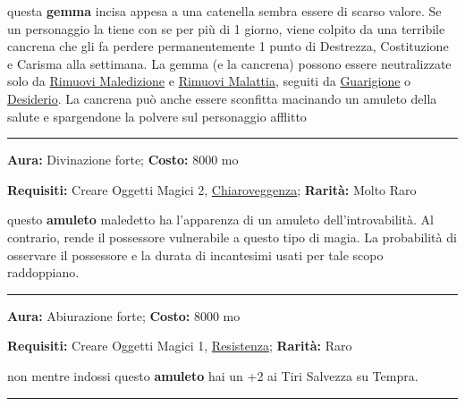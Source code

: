 \begin{multicols}{2}
questa \textbf{gemma} incisa appesa a una catenella sembra essere di scarso valore. Se un personaggio la tiene con se per più di 1 giorno, viene colpito da una terribile cancrena che gli fa perdere permanentemente 1 punto di Destrezza, Costituzione e Carisma alla settimana. La gemma (e la cancrena) possono essere neutralizzate solo da \hyperlink{Rimuovi Maledizione}{Rimuovi Maledizione} e \hyperlink{Rimuovi Malattia}{Rimuovi Malattia}, seguiti da \hyperlink{BastonedellaGuarigione}{Guarigione} o \hyperlink{Desiderio}{Desiderio}. La cancrena può anche essere sconfitta macinando un amuleto della salute e spargendone la polvere sul personaggio afflitto

\smallskip\noindent\rule{\linewidth}{2pt}  \hypertarget{AmuletodellaLocalizzazioneinevitabile}{}\medskip{}\noindent\label{AmuletodellaLocalizzazioneinevitabile}

\textbf{Aura:} Divinazione forte; \textbf{Costo:} 8000 mo

\textbf{Requisiti:} Creare Oggetti Magici 2, \hyperlink{PozionedellaChiaroveggenzaanimale}{Chiaroveggenza}; \textbf{Rarità:} Molto Raro


questo \textbf{amuleto} maledetto ha l'apparenza di un amuleto dell'introvabilità. Al contrario, rende il possessore vulnerabile a questo tipo di magia. La probabilità di osservare il possessore e la durata di incantesimi usati per tale scopo raddoppiano.

\smallskip\noindent\rule{\linewidth}{2pt}  \hypertarget{AmuletodellaResistenzaFisica}{}\medskip{}\noindent\label{AmuletodellaResistenzaFisica}

\textbf{Aura:} Abiurazione forte; \textbf{Costo:} 8000 mo

\textbf{Requisiti:} Creare Oggetti Magici 1, \hyperlink{ResistenzaalVeleno}{Resistenza}; \textbf{Rarità:} Raro

non mentre indossi questo \textbf{amuleto} hai un +2 ai Tiri Salvezza su Tempra.

\smallskip\noindent\rule{\linewidth}{2pt}  \hypertarget{AmuletodiProtezionedallaIndividuazioneeLocalizzazione}{}\medskip{}\noindent\label{AmuletodiProtezionedallaIndividuazioneeLocalizzazione}


\end{multicols}

